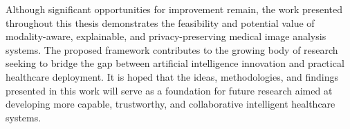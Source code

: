 Although significant opportunities for improvement remain, the work presented throughout this thesis demonstrates the feasibility and potential value of modality-aware, explainable, and privacy-preserving medical image analysis systems. The proposed framework contributes to the growing body of research seeking to bridge the gap between artificial intelligence innovation and practical healthcare deployment. It is hoped that the ideas, methodologies, and findings presented in this work will serve as a foundation for future research aimed at developing more capable, trustworthy, and collaborative intelligent healthcare systems.